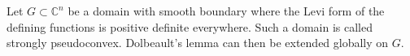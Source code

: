 Let $G \subset \mathbb{C}^n$ be a domain with smooth boundary where the Levi form of the defining functions is positive definite everywhere. Such a domain is called strongly pseudoconvex. Dolbeault's lemma can then be extended globally on $G$.
